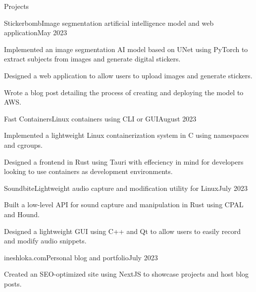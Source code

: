 \documentclass{article}
\newlength{\tabin}
\newlength{\secsep}
\newenvironment{tabbedsection}[1]{
  \begin{list}{}{
      \setlength{\itemsep}{0pt}
      \setlength{\labelsep}{0pt}
      \setlength{\labelwidth}{0pt}
      \setlength{\leftmargin}{\tabin}
      \setlength{\rightmargin}{\tabin}
      \setlength{\listparindent}{0pt}
      \setlength{\parsep}{0pt}
      \setlength{\parskip}{0pt}
      \setlength{\partopsep}{0pt}
      \setlength{\topsep}{#1}
    }
  \item[]
}{\end{list}}
\newenvironment{resume_section}[1]{
  \filbreak
  \vspace{2\secsep}
  {\color {MyDarkBlue}\textbf{\large #1}} \hrulefill
  \begin{tabbedsection}{\secsep}
}{\end{tabbedsection}}
\newenvironment{subitems}{
  \renewcommand{\labelitemi}{-}
  \begin{itemize}
      \setlength{\labelsep}{1em}
}{\end{itemize}}
\newenvironment{resume_employer}[4]{
  \vspace{\secsep}
  \textbf{#1} \\ 
  \indent {\small #2} \hfill {\footnotesize#3 (#4)}
  \begin{tabbedsection}{0pt}
  \begin{subitems}
}{\end{subitems}\end{tabbedsection}}
\begin{document}
\begin{resume_section}{Projects}
  \begin{resume_employer}{Stickerbomb}{Image segmentation artificial intelligence model and web application}{}{May 2023}
    \item Implemented an image segmentation AI model based on UNet using PyTorch to extract subjects from images and generate digital stickers.
    \item Designed a web application to allow users to upload images and generate stickers.
    \item Wrote a blog post detailing the process of creating and deploying the model to AWS.
  \end{resume_employer}

  \begin{resume_employer}{Fast Containers}{Linux containers using CLI or GUI}{}{August 2023}
    \item Implemented a lightweight Linux containerization system in C using namespaces and cgroups.
    \item Designed a frontend in Rust using Tauri with effeciency in mind for developers looking to use containers as development environments.
  \end{resume_employer}

  \begin{resume_employer}{Soundbite}{Lightweight audio capture and modification utility for Linux}{}{July 2023}
    \item Built a low-level API for sound capture and manipulation in Rust using CPAL and Hound.
    \item Designed a lightweight GUI using C++ and Qt to allow users to easily record and modify audio snippets.
  \end{resume_employer}

  \begin{resume_employer}{ineshloka.com}{Personal blog and portfolio}{}{July 2023}
    \item Created an SEO-optimized site using NextJS to showcase projects and host blog posts.
  \end{resume_employer}
\end{resume_section}
\end{document}
